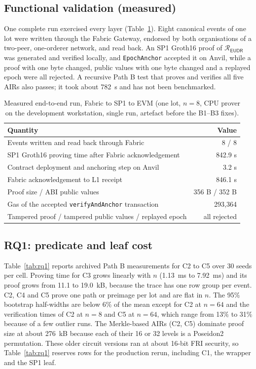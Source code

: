 \documentclass[runningheads]{llncs}
\newif\ifmarkrev
\newcommand{\rev}[1]{\ifmarkrev{\color{blue}#1}\else#1\fi}
\newcommand{\hd}[1]{{\bfseries\boldmath #1}}
\newcommand{\Rel}{\mathcal{R}_{\mathsf{EUDR}}}
\begin{document}
\subsection{Functional validation (measured)}
One complete run exercised every layer (Table~\ref{tab:e2smoke}). Eight canonical events of one lot were written through the Fabric Gateway, endorsed by both organisations of a two-peer, one-orderer network, and read back. An SP1 Groth16 proof of $\Rel$ was generated and verified locally, and \texttt{EpochAnchor} accepted it on Anvil, while a proof with one byte changed, public values with one byte changed and a replayed epoch were all rejected. A recursive Path B test that proves and verifies all five AIRs also passes; it took about 782~s and has not been benchmarked.

\begin{table}[t]
\centering
\caption{Measured end-to-end run, Fabric to SP1 to EVM (one lot, $n=8$, CPU prover on the development workstation, single run, \rev{artefact before the B1--B3 fixes}).}
\label{tab:e2smoke}
\scriptsize
\begin{tabular}{@{}lr@{}}
\toprule
\hd{Quantity} & \hd{Value} \\
\midrule
Events written and read back through Fabric & 8 / 8 \\
SP1 Groth16 proving time after Fabric acknowledgement & 842.9 s \\
Contract deployment and anchoring step on Anvil & 3.2 s \\
Fabric acknowledgement to L1 receipt & 846.1 s \\
Proof size / ABI public values & 356 B / 352 B \\
Gas of the accepted \texttt{verifyAndAnchor} transaction & 293,364 \\
Tampered proof / tampered public values / replayed epoch & all rejected \\
\bottomrule
\end{tabular}
\end{table}

\subsection{RQ1: predicate and leaf cost}
Table~\ref{tab:rq1} reports archived Path B measurements for C2 to C5 over 30 seeds per cell. Proving time for C3 grows linearly with $n$ (1.13~ms to 7.92~ms) and its proof grows from 11.1 to 19.0~kB, because the trace has one row group per event. C2, C4 and C5 prove one path or preimage per lot and are flat in $n$. \rev{The 95\% bootstrap half-widths are below 6\% of the mean except for C2 at $n=64$ and the verification times of C2 at $n=8$ and C5 at $n=64$, which range from 13\% to 31\% because of a few outlier runs.} The Merkle-based AIRs (C2, C5) dominate proof size at about 276~kB because each of their 16 or 32 levels is a Poseidon2 permutation. These older circuit versions ran at about 16-bit FRI security, so Table~\ref{tab:rq1} reserves rows for the production rerun, including C1, the wrapper and the SP1 leaf.
\end{document}
